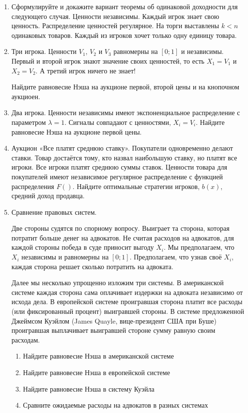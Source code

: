\begin{enumerate}

\item Сформулируйте и докажите вариант теоремы об одинаковой доходности для следующего случая. Ценности независимы. Каждый игрок знает свою ценность. Распределение ценностей регулярное. На торги выставлены $ k<n $ одинаковых товаров. Каждый из игроков хочет только одну единицу товара.

\item Три игрока. Ценности $ V_{1} $, $ V_{2} $ и $ V_{3} $ равномерны на $ [0;1] $ и независимы. Первый и второй игрок знают значение своих ценностей, то есть $ X_{1}=V_{1} $ и $ X_{2}=V_{2} $. А третий игрок ничего не знает!

Найдите равновесие Нэша на аукционе первой, второй цены и на кнопочном аукциоен.


\item Два игрока. Ценности независимы имеют экспоненциальное распределение с параметром $ \lambda=1 $. Сигналы совпадают с ценностями,  $ X_{i}=V_{i} $. Найдите равновесие Нэша на аукционе первой цены.




\item Аукцион «Все платят среднюю ставку». Покупатели одновременно делают ставки. Товар достаётся тому, кто назвал наибольшую ставку, но платят все игроки. Все игроки платят среднюю суммы ставок. Ценности товара для покупателей имеют независимое регулярное распределение с функцией распределения $ F() $. Найдите оптимальные стратегии игроков, $ b(x) $, средний доход продавца.



\item Сравнение правовых систем.

Две стороны судятся по спорному вопросу. Выиграет та сторона, которая потратит больше денег на адвокатов. Не считая расходов на адвокатов, для каждой стороны победа в суде приносит выгоду $ X_{i} $. Мы предполагаем, что $ X_{i} $ независимы и равномерны на $ [0;1] $. Предполагаем, что узнав своё $ X_{i} $, каждая сторона решает сколько потратить на адвоката.

Далее мы несколько упрощенно изложим три системы. В американской системе каждая сторона сама оплачивает издержки на адвоката независимо от исхода дела. В европейской системе проигравшая сторона платит все расходы (или фиксированный процент) выигравшей стороны. В системе предложенной Джеймсом Куэйлом (James Quayle, вице-президент США при Буше) проигравшая выплачивает выигравшей стороне сумму равную своим расходам.
\begin{enumerate}
\item Найдите равновесие Нэша в американской системе
\item Найдите равновесие Нэша в европейской системе
\item Найдите равновесие Нэша в систему Куэйла
\item Сравните ожидаемые расходы на адвокатов в разных системах
\end{enumerate}



\end{enumerate}
